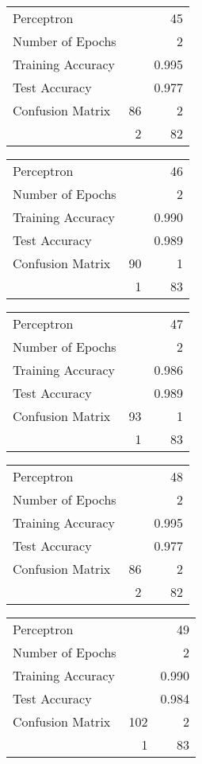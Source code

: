 \documentclass[11pt,twocolumn]{article}
\begin{document}
\begin{center}
\begin{tabular}{l | r r}
Perceptron &&45\\
Number of Epochs & &2\\
Training Accuracy & &0.995\\
Test Accuracy & &0.977\\
Confusion Matrix &86 & 2\\
 &2 & 82\\
\end{tabular}
\end{center}
\begin{center}
\begin{tabular}{l | r r}
Perceptron &&46\\
Number of Epochs & &2\\
Training Accuracy & &0.990\\
Test Accuracy & &0.989\\
Confusion Matrix &90 & 1\\
 &1 & 83\\
\end{tabular}
\end{center}
\begin{center}
\begin{tabular}{l | r r}
Perceptron &&47\\
Number of Epochs & &2\\
Training Accuracy & &0.986\\
Test Accuracy & &0.989\\
Confusion Matrix &93 & 1\\
 &1 & 83\\
\end{tabular}
\end{center}
\begin{center}
\begin{tabular}{l | r r}
Perceptron &&48\\
Number of Epochs & &2\\
Training Accuracy & &0.995\\
Test Accuracy & &0.977\\
Confusion Matrix &86 & 2\\
 &2 & 82\\
\end{tabular}
\end{center}
\begin{center}
\begin{tabular}{l | r r}
Perceptron &&49\\
Number of Epochs & &2\\
Training Accuracy & &0.990\\
Test Accuracy & &0.984\\
Confusion Matrix &102 & 2\\
 &1 & 83\\
\end{tabular}
\end{center}
\end{document}
